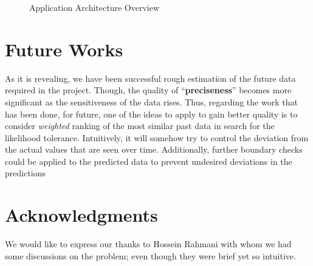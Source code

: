 \documentclass{acm_proc_article-sp}
\begin{document}
\begin{figure}[h] 
\centering
\setlength\fboxsep{0.1pt}
\setlength\fboxrule{0.7pt}
\caption{Application Architecture Overview} \label{fig:apparch}
\end{figure}

\section{Future Works} \label{sec:future}
As it is revealing, we have been successful rough estimation of the future data required in the project. Though, the
quality of ``\textbf{preciseness}'' becomes more significant as the sensitiveness of the data rises. Thus, regarding
the work that has been done, for future, one of the ideas to apply to gain better quality is to consider
\textit{weighted} ranking of the most similar past data in search for the likelihood tolerance. Intuitively, it will
somehow try to control the deviation from the actual values that are seen over time. Additionally, further boundary
checks could be applied to the predicted data to prevent undesired deviations in the predictions

%

\section{Acknowledgments} \label{sec:ack}
We would like to express our thanks to Hossein Rahmani with whom we had some discussions on the problem; even though
they were brief yet so intuitive.



\end{document}
